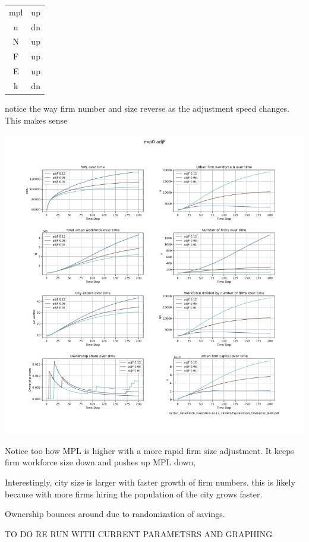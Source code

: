 \documentclass{article}
\begin{document}
\begin{multicols}{2}
\begin{tabular}{c|c}
  mpl   &  up\\
  n   &  dn\\
  N   &  up\\
  F   & up \\
  E   &  up\\
  k   & dn
\end{tabular}

  notice the way firm number and size reverse as the adjustment speed changes. This makes sense
  
\end{multicols}

\includegraphics[scale=.55]{fig/Analysis/AdjF.png}

Notice too how MPL  is higher with a more rapid firm size adjustment. It keeps  firm workforce size down and pushes up MPL down, 

  Interestingly, city size is larger with faster growth of firm numbers. this is likely because with more firms hiring the population of the city grows faster.

  Ownership bounces around due to randomization of savings.


TO DO RE RUN WITH CURRENT PARAMETSRS AND GRAPHING
\newpage
\end{document}
